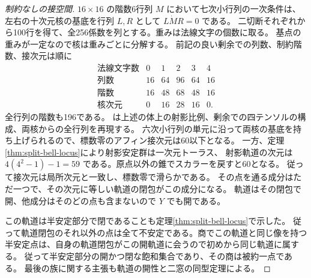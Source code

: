 \begin{proof}[制約なしの接空間]
$16\times16$ の階数6行列 $M$ において七次小行列の一次条件は、
左右の十次元核の基底を行列 $L,R$ として $L\dot M R=0$ である。
二切断それぞれから100行を得て、全256係数を列とする。重みは法線文字の個数に取る。
基点の重みが一定なので核は重みごとに分解する。
前記の良い剰余での列数、制約階数、接次元は順に
\[
\begin{array}{c|rrrrr}
\text{法線文字数}&0&1&2&3&4\\\hline
\text{列数}&16&64&96&64&16\\
\text{階数}&16&48&68&48&16\\
\text{核次元}&0&16&28&16&0 .
\end{array}
\]
全行列の階数も196である。
は上述の体上の射影比例、剰余での四テンソルの構成、両核からの全行列を再現する。
六次小行列の単元に沿って両核の基底を持ち上げられるので、標数零のアフィン接次元は60以下となる。
一方、定理\ref{thm:split-bell-locus}により射影安定群は一次元トーラス、
射影軌道の次元は $4(4^2-1)-1=59$ である。原点以外の錐でスカラーを戻すと60となる。
従って接次元は局所次元と一致し、標数零で滑らかである。
その点を通る成分はただ一つで、その次元に等しい軌道の閉包がこの成分になる。
軌道はその閉包で開、他成分はそのどの点も含まないので $Y$ でも開である。

この軌道は半安定部分で閉であることも定理\ref{thm:split-bell-locus}で示した。
従って軌道閉包のそれ以外の点は全て不安定である。商でこの軌道と同じ像を持つ
半安定点は、自身の軌道閉包がこの開軌道に会うので初めから同じ軌道に属する。
従って半安定部分の開かつ閉な飽和集合であり、その商は被約一点である。
最後の族に関する主張も軌道の開性と二窓の同型定理による。
\end{proof}
